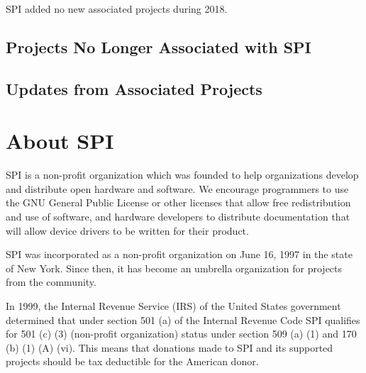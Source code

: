 \documentclass[a4paper]{report}
\begin{document}
SPI added no new associated projects during 2018.

\section{Projects No Longer Associated with SPI}

\section{Updates from Associated Projects}


\appendix
\chapter{About SPI}

SPI is a non-profit organization which was founded to help organizations
develop and distribute open hardware and software. We encourage programmers
to use the GNU General Public License or other licenses that allow free
redistribution and use of software, and hardware developers to distribute
documentation that will allow device drivers to be written for their product.

SPI was incorporated as a non-profit organization on June 16, 1997 in the state
of New York. Since then, it has become an umbrella organization for projects
from the community.

In 1999, the Internal Revenue Service (IRS) of the United States government
determined that under section 501 (a) of the Internal Revenue Code SPI
qualifies for 501 (c) (3) (non-profit organization) status under section 509
(a) (1) and 170 (b) (1) (A) (vi). This means that donations made to SPI and its
supported projects should be tax deductible for the American donor.

\newpage

\pagestyle{empty}
\end{document}
